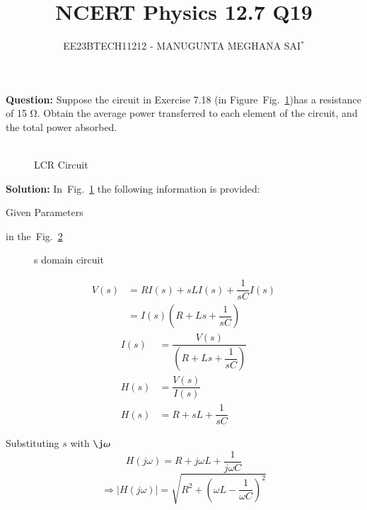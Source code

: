 \documentclass[journal,12pt,twocolumn]{IEEEtran}
\title{
	
\title{NCERT Physics 12.7 Q19}
\author{EE23BTECH11212 - MANUGUNTA MEGHANA SAI$^{*}$%
}


}
\newcommand\figref{Fig.~\ref}
\theoremstyle{remark}
\begin{document}
\maketitle

\textbf{Question:} 
Suppose the circuit in Exercise 7.18 (in Figure~\figref{fig:2})has a resistance of 15 Ω. Obtain the average power transferred to each element of the circuit, and the total power absorbed.\\
\\

\begin{figure}[h]
	\centering
	
	\caption{LCR Circuit}
	\label{fig:2}
\end{figure}
     
\textbf{Solution: }
In~\figref{fig:2} the following information is provided:
 
 

 \begin{table}[h]
 	\centering
 	\resizebox{6 cm}{!}{
 		
 	}
 	\vspace{6 pt}
 	\caption{Given Parameters}
 	\label{tab:my_label} 
 \end{table} 
  in the~\figref{fig:1}
 
 \begin{figure}[!h]
 	\centering
 	
 	\caption{s domain circuit}
 	\label{fig:1}
 	
 \end{figure}
 \begin{align}
 	V(s) &= R I(s) + sL I(s) + \dfrac{1}{sC} I(s)\\
         &= I(s)\left(R + Ls + \dfrac{1}{sC}\right)
 \end{align}
\begin{align}
    I(s) &= \dfrac{V(s)}{\left(R + Ls + \dfrac{1}{sC}\right)}\\ 
    H(s) &= \dfrac{V(s)}{I(s)}\\
	H(s) &= R + sL + \dfrac{1}{sC}
\end{align}

Substituting $s$ with $\j \omega$
\begin{equation}
	H(j\omega) = R + j\omega L + \dfrac{1}{j\omega C}
\end{equation}
\begin{equation}
	\Rightarrow \lvert H(j\omega) \rvert = \sqrt{R^2 + \left(\omega L - \dfrac{1}{\omega C}\right)^2}
	\label{eq:1}
\end{equation}
\end{document}
